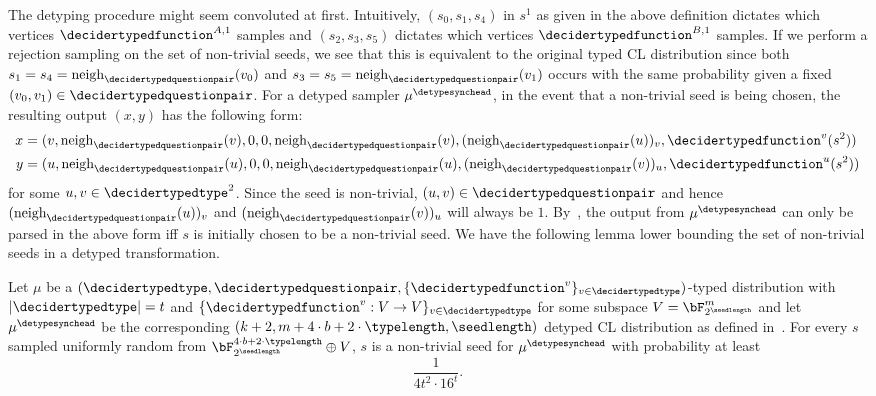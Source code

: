 The detyping procedure might seem convoluted at first. Intuitively, $(s_0, s_1, s_4)$ in $s^1$ as given in the above definition dictates which vertices $\decidertypedfunction^{A,1}$ samples and $(s_2, s_3, s_5)$ dictates which vertices $\decidertypedfunction^{B,1}$ samples. If we perform a rejection sampling on the set of non-trivial seeds, we see that this is equivalent to the original typed CL distribution since both $s_1 = s_4 = \text{neigh}_{\decidertypedquestionpair}(v_0)$ and $s_3= s_5 = \text{neigh}_{\decidertypedquestionpair}(v_1)$ occurs with the same probability given a fixed $(v_0, v_1) \in \decidertypedquestionpair$. For a detyped sampler $\mu^{\detypesynchead}$, in the event that a non-trivial seed is being chosen, the resulting output $(x,y)$ has the following form:
\begin{align}
	\nonumber x &= (v, \text{neigh}_{\decidertypedquestionpair}(v), 0,0,\text{neigh}_{\decidertypedquestionpair}(v), (\text{neigh}_{\decidertypedquestionpair}(u))_{v}, \decidertypedfunction^v(s^2)) \\
	y &= (u, \text{neigh}_{\decidertypedquestionpair}(u), 0,0,\text{neigh}_{\decidertypedquestionpair}(u), (\text{neigh}_{\decidertypedquestionpair}(v))_{u}, \decidertypedfunction^u(s^2)) \label{eq:parsetypedgame}
\end{align}
for some $u,v \in \decidertypedtype^2$. Since the seed is non-trivial, $(u,v) \in \decidertypedquestionpair$ and hence $(\text{neigh}_{\decidertypedquestionpair}(u))_{v}$ and $(\text{neigh}_{\decidertypedquestionpair}(v))_{u}$ will always be $1$. By~, the output from $\mu^{\detypesynchead}$ can only be parsed in the above form iff $s$ is initially chosen to be a non-trivial seed. We have the following lemma lower bounding the set of non-trivial seeds in a detyped transformation. 
\begin{lemma} \label{lem:nontrivialseedCLdistribution}
	Let $\mu$ be a $(\decidertypedtype, \decidertypedquestionpair, \{\decidertypedfunction^v \}_{v \in \decidertypedtype})$-typed distribution with $|\decidertypedtype| =  t$ and $\{\decidertypedfunction^v: V \rightarrow V\}_{v \in \decidertypedtype}$ for some subspace $V  = \bF_{2^{\seedlength}}^{m}$ and let $\mu^{\detypesynchead}$ be the corresponding $(k+2, m+ 4\cdot b + 2\cdot \typelength, \seedlength)$ detyped CL distribution as defined in~. For every $s$ sampled uniformly random from $\bF_{2^{\seedlength}}^{4\cdot b + 2\cdot \typelength} \oplus V$, $s$ is a non-trivial seed for $\mu^{\detypesynchead}$ with probability at least 
	\begin{equation*}
		\frac{1}{4t^2 \cdot 16^{t}}.
	\end{equation*}
\end{lemma}

